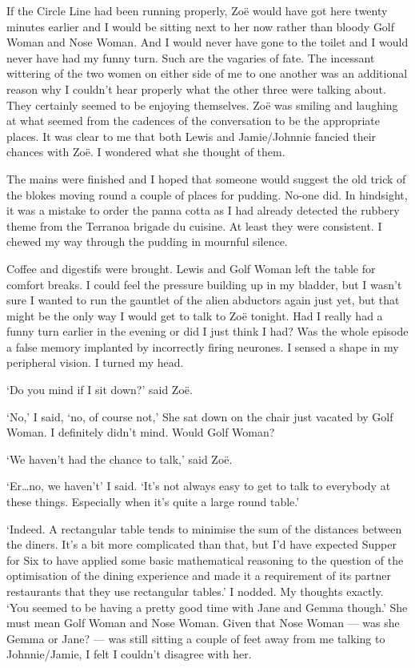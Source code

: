 If the Circle Line had been running properly, Zoë would have got
here twenty minutes earlier and I would be sitting next to her now
rather than bloody Golf Woman and Nose Woman. And I would never have gone to the toilet and I would never have had my funny turn. Such are the vagaries of fate. The
incessant wittering of the two women on either side of me to one another was an additional reason why I couldn't hear properly what
the other three were talking about. They certainly seemed to be
enjoying themselves. Zoë was smiling and laughing at what seemed
from the cadences of the conversation to be the appropriate places.
It was clear to me that both Lewis and Jamie/Johnnie fancied their
chances with Zoë. I wondered what she thought of them.

The mains were finished and I hoped that someone would suggest the old trick
of the blokes moving round a couple of places for pudding. No-one did. In hindsight,
it was a mistake to order the panna cotta as I had already detected the
rubbery theme from the Terranoa brigade du cuisine. At least they were consistent. I chewed my way through the pudding in mournful silence.

Coffee and digestifs were brought. Lewis and Golf Woman left the
table for comfort breaks. I could feel the pressure building up in my bladder, but I wasn't sure I wanted to run the gauntlet of the alien abductors again just yet, but that might be the only way I would get to talk to Zoë tonight. Had I really had a funny turn earlier in the evening or did I just think I had? Was the whole episode a false memory implanted by incorrectly firing neurones. I sensed a shape in my peripheral vision. I turned my head.

`Do you mind if I sit down?' said Zoë.

`No,' I said, `no, of course not,' She sat down on the chair just
vacated by Golf Woman. I definitely didn't mind. Would Golf Woman?

`We haven't had the chance to talk,' said Zoë.

`Er\dots no, we haven't' I said. `It's not always easy to get to
talk to everybody at these things. Especially when it's quite a
large round table.'

`Indeed. A rectangular table tends to minimise the sum of the
distances between the diners. It's a bit more complicated than that,
but I'd have expected Supper for Six to have applied some basic
mathematical reasoning to the question of the optimisation of the dining
experience and made it a requirement of its partner restaurants that
they use rectangular tables.' I nodded. My thoughts exactly. `You
seemed to be having a pretty good time with Jane and Gemma though.'
She must mean Golf Woman and Nose Woman. Given that Nose Woman ---
was she Gemma or Jane? --- was still sitting a couple of feet away
from me talking to Johnnie/Jamie, I felt I couldn't disagree with
her.

